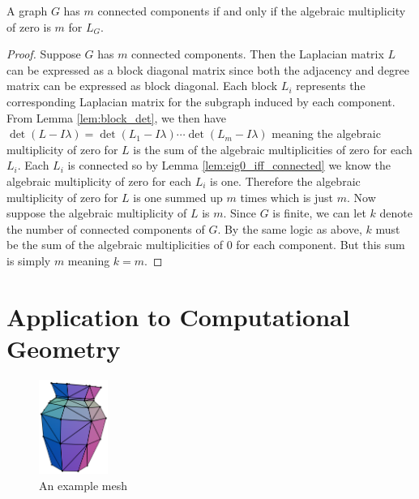 \documentclass[11pt]{article}
\begin{document}
\begin{theorem}
    \label{thm:main_thm}
    A graph $G$ has $m$ connected components if and only if the algebraic multiplicity of zero is $m$ for $L_G$.
\end{theorem}

\begin{proof}
    Suppose $G$ has $m$ connected components. Then the Laplacian matrix $L$ can be expressed as a block diagonal matrix since both the adjacency and degree matrix can be expressed as block diagonal. Each block $L_i$ represents the corresponding Laplacian matrix for the subgraph induced by each component. From Lemma \ref{lem:block_det}, we then have $\det(L - I \lambda) = \det(L_1 - I \lambda) \cdots \det(L_m - I \lambda)$ meaning the algebraic multiplicity of zero for $L$ is the sum of the algebraic multiplicities of zero for each $L_i$. Each $L_i$ is connected so by Lemma \ref{lem:eig0_iff_connected} we know the algebraic multiplicity of zero for each $L_i$ is one. Therefore the algebraic multiplicity of zero for $L$ is one summed up $m$ times which is just $m$. Now suppose the algebraic multiplicity of $L$ is $m$. Since $G$ is finite, we can let $k$ denote the number of connected components of $G$. By the same logic as above, $k$ must be the sum of the algebraic multiplicities of $0$ for each component. But this sum is simply $m$ meaning $k = m$.
\end{proof}

\section{Application to Computational Geometry}

\captionsetup{justification=centering,singlelinecheck=false}
\begin{figure}
    \vspace{-2.1cm}
    \begin{center}
        \includegraphics[width=0.20\textwidth]{figures/vase_all_cropped.png}
    \end{center}
    \caption{An example mesh}
    \label{fig:vase}
\end{figure}
\end{document}
